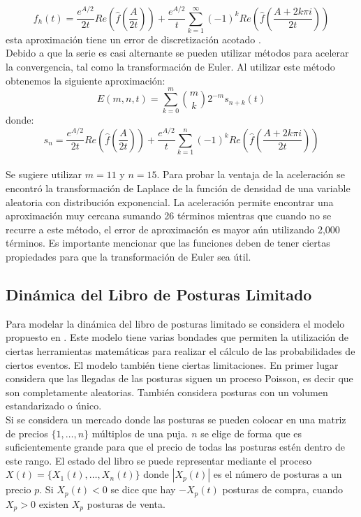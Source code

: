 \documentclass[11pt]{article}
\numberwithin{equation}{section} %
\begin{document}
\[
f_h(t)=\frac{e^{A/2}}{2t} Re\left(\hat{f}\left(\frac{A}{2t}\right)\right)+\frac{e^{A/2}}{t}\sum_{k=1}^{\infty}(-1)^k Re\left(\hat{f}\left(\frac{A+2k\pi i}{2t}\right)\right)
\]
esta aproximación tiene un error de discretización acotado \cite{abate1995}.\\

Debido a que la serie es casi alternante se pueden utilizar métodos para acelerar la convergencia, tal como la transformación de Euler. Al utilizar este método obtenemos la siguiente aproximación:
\[
E(m,n,t)=\sum_{k=0}^m \binom mk 2^{-m}s_{n+k}(t)
\]
donde:
\[
s_n=\frac{e^{A/2}}{2t} Re\left(\hat{f}\left(\frac{A}{2t}\right)\right)+\frac{e^{A/2}}{t}\sum_{k=1}^{n}(-1)^k Re\left(\hat{f}\left(\frac{A+2k\pi i}{2t}\right)\right)
\]
\\

Se sugiere utilizar $m=11$ y $n=15$. Para probar la ventaja de la aceleración se encontró la transformación de Laplace de la función de densidad de una variable aleatoria con distribución exponencial. La aceleración permite encontrar una aproximación muy cercana sumando 26 términos mientras que cuando no se recurre a este método, el error de aproximación es mayor aún utilizando 2,000 términos. Es importante mencionar que las funciones deben de tener ciertas propiedades para que la transformación de Euler sea útil.

\subsection{Dinámica del Libro de Posturas Limitado}

Para modelar la dinámica del libro de posturas limitado se considera el modelo propuesto en \cite{Cont2010}. Este modelo tiene varias bondades que permiten la utilización de ciertas herramientas matemáticas para realizar el cálculo de las probabilidades de ciertos eventos. El modelo también tiene ciertas limitaciones. En primer lugar considera que las llegadas de las posturas siguen un proceso Poisson, es decir que son completamente aleatorias. También considera posturas con un volumen estandarizado o único.\\

Si se considera un mercado donde las posturas se pueden colocar en una matriz de precios $\{1,\ldots,n\}$ múltiplos de una puja. $n$ se elige de forma que es suficientemente grande para que el precio de todas las posturas estén dentro de este rango. El estado del libro se puede representar mediante el proceso $X(t)=\{X_1(t),\ldots,X_n(t)\}$ donde $|X_p(t)|$ es el número de posturas a un precio $p$. Si $X_p(t)<0$ se dice que hay $-X_p(t)$ posturas de compra, cuando $X_p>0$ existen $X_p$ posturas de venta.
\end{document}
